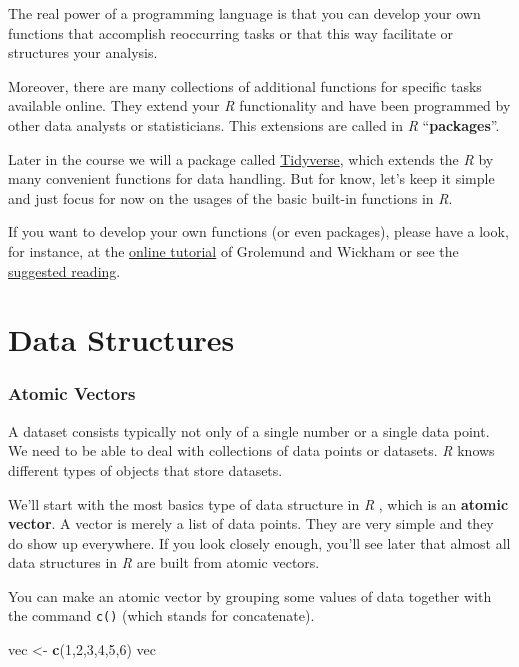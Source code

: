 \documentclass[
]{scrartcl}
\makeatletter
\newenvironment{Shaded}{\begin{snugshade}}{\end{snugshade}}
\newcommand{\DecValTok}[1]{\textcolor[rgb]{0.00,0.00,0.81}{#1}}
\newcommand{\FunctionTok}[1]{\textcolor[rgb]{0.13,0.29,0.53}{\textbf{#1}}}
\newcommand{\NormalTok}[1]{#1}
\newcommand{\OtherTok}[1]{\textcolor[rgb]{0.56,0.35,0.01}{#1}}
\newenvironment{kframe}{%
\medskip{}
\setlength{\fboxsep}{.8em}
 \def\at@end@of@kframe{}%
 \ifinner\ifhmode%
  \def\at@end@of@kframe{\end{minipage}}%
  \begin{minipage}{\columnwidth}%
 \fi\fi%
 \def\FrameCommand##1{\hskip\@totalleftmargin \hskip-\fboxsep
 \colorbox{shadecolor}{##1}\hskip-\fboxsep
     \hskip-\linewidth \hskip-\@totalleftmargin \hskip\columnwidth}%
 \MakeFramed {\advance\hsize-\width
   \@totalleftmargin\z@ \linewidth\hsize
   \@setminipage}}%
 {\par\unskip\endMakeFramed%
 \at@end@of@kframe}
\newenvironment{rmdblock}[1]
  {
  \begin{itemize}
  \renewcommand{\labelitemi}{
    \raisebox{-.7\height}[0pt][0pt]{
      {\setkeys{Gin}{width=3em,keepaspectratio}\texttt{[image: images/\#1]}}
    }
  }
  \setlength{\fboxsep}{1em}
  \begin{kframe}
  \item
  }
  {
  \end{kframe}
  \end{itemize}
  }
\newenvironment{geek}
    {\begin{rmdblock}{geek}}
    {\end{rmdblock}}
\makeatother
\begin{document}
The real power of a programming language is that you can develop your own functions that accomplish reoccurring tasks or that this way facilitate or structures your analysis.

Moreover, there are many collections of additional functions for specific tasks available online. They extend your \emph{R} functionality and have been programmed by other data analysts or statisticians. This extensions are called in \emph{R} ``\textbf{packages}''.

Later in the course we will a package called \href{https://www.tidyverse.org/}{Tidyverse}, which extends the \emph{R} by many convenient functions for data handling. But for know, let's keep it simple and just focus for now on the usages of the basic built-in functions in \emph{R}.

\begin{geek}
If you want to develop your own functions (or even packages), please
have a look, for instance, at the
\href{https://r4ds.had.co.nz/functions.html}{online tutorial} of
Grolemund and Wickham or see the \hyperref[readings]{suggested reading}.
\end{geek}

\newpage

\part{Data Structures}\label{part-data-structures}

\section{Atomic Vectors}\label{vectors}

A dataset consists typically not only of a single number or a single data point. We need to be able to deal with collections of data points or datasets. \emph{R} knows different types of objects that store datasets.

We'll start with the most basics type of data structure in \emph{R} , which is an \textbf{atomic vector}. A vector is merely a list of data points. They are very simple and they do show up everywhere. If you look closely enough, you'll see later that almost all data structures in \emph{R} are built from atomic vectors.

You can make an atomic vector by grouping some values of data together with the command \texttt{c()} (which stands for concatenate).

\begin{Shaded}
\begin{Highlighting}[]
\NormalTok{vec }\OtherTok{\textless{}{-}} \FunctionTok{c}\NormalTok{(}\DecValTok{1}\NormalTok{,}\DecValTok{2}\NormalTok{,}\DecValTok{3}\NormalTok{,}\DecValTok{4}\NormalTok{,}\DecValTok{5}\NormalTok{,}\DecValTok{6}\NormalTok{)}
\NormalTok{vec}
\end{Highlighting}
\end{Shaded}
\end{document}
